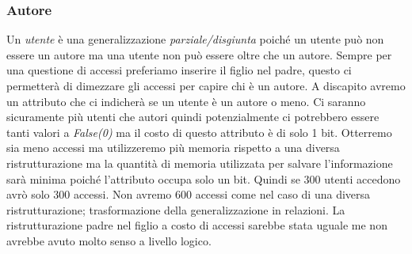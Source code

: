\subsubsection{Autore}
    Un \textit{utente} è una generalizzazione \textit{parziale/disgiunta} poiché un utente può non essere un autore  ma una utente non può essere oltre che un autore.
    Sempre per una questione di accessi preferiamo inserire il figlio nel padre, questo ci permetterà di dimezzare gli accessi per capire chi è un autore. A discapito avremo un attributo che ci indicherà se un utente è un autore o meno. Ci saranno sicuramente più utenti che autori quindi potenzialmente ci potrebbero essere tanti valori a \textit{False(0)} ma il costo di questo attributo è di solo 1 bit. Otterremo sia meno accessi ma utilizzeremo più memoria rispetto a una diversa ristrutturazione ma la quantità di memoria utilizzata per salvare l'informazione sarà minima poiché l'attributo occupa solo un bit. Quindi se 300 utenti accedono avrò solo 300 accessi. Non avremo 600 accessi come nel caso di una diversa ristrutturazione; trasformazione della generalizzazione in relazioni. La ristrutturazione padre nel figlio a costo di accessi sarebbe stata uguale me non avrebbe avuto  molto senso a livello logico.
